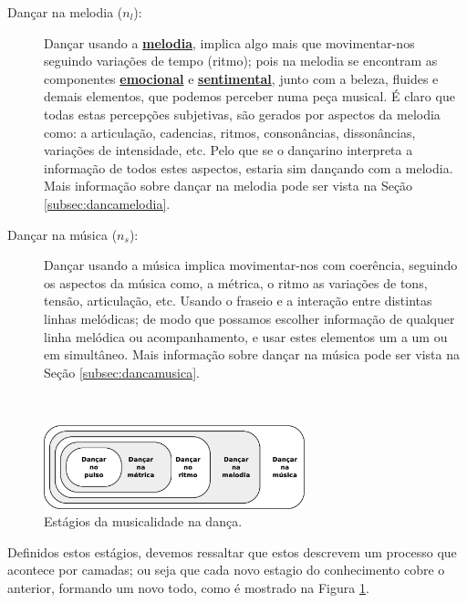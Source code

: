 \begin{description}
\item[Dançar na melodia  ($n_l$):] Dançar usando a \hyperref[sec:pos:Melodia]{\textbf{melodia}},
implica algo mais que movimentar-nos seguindo variações de tempo (ritmo); 
pois na melodia se encontram as componentes \hyperref[ref:emotionsentimental]{\textbf{emocional}} 
e \hyperref[ref:emotionsentimental]{\textbf{sentimental}}, junto com a beleza, fluides e demais elementos, 
que podemos perceber numa peça musical.
É claro que todas estas percepções subjetivas, 
são gerados por aspectos da melodia como: a articulação, cadencias, ritmos, consonâncias, dissonâncias,
variações de intensidade, etc. 
Pelo que se o dançarino interpreta a informação de todos estes aspectos,
estaria sim dançando com a melodia.
Mais informação sobre dançar na melodia pode ser vista na Seção \ref{subsec:dancamelodia}.
\item[Dançar na música  ($n_s$):] 
Dançar usando a música implica movimentar-nos com coerência, 
seguindo os aspectos da música como, a métrica, 
o ritmo as variações de tons, tensão, articulação, etc.
Usando o fraseio e a interação entre distintas linhas melódicas;
de modo que possamos escolher informação de qualquer linha melódica ou acompanhamento,
e usar estes elementos um a um ou em simultâneo.
Mais informação sobre dançar na música pode ser vista na Seção \ref{subsec:dancamusica}.
\end{description}
~

\begin{figure}
    \centering
    \vspace{-10pt}
    \includegraphics[width=0.675\textwidth]{chapters/cap-musicalidade-tecnica/aspectos-musica.eps}
    \caption{Estágios da musicalidade na dança.}
    \vspace{-10pt}
    \label{fig:aspectos-musica}
\end{figure}
Definidos estos estágios, 
devemos ressaltar que estos descrevem um processo que acontece por camadas;
ou seja que cada novo estagio do conhecimento cobre o anterior, formando um novo todo,
como é mostrado na Figura \ref{fig:aspectos-musica}.

